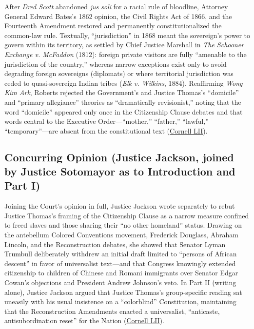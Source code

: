 \documentclass[12pt]{article}
\begin{document}
After \textit{Dred Scott} abandoned \textit{jus soli} for a racial rule of bloodline, Attorney General Edward Bates's 1862 opinion, the Civil Rights Act of 1866, and the Fourteenth Amendment restored and permanently constitutionalized the common-law rule. Textually, ``jurisdiction'' in 1868 meant the sovereign's power to govern within its territory, as settled by Chief Justice Marshall in \textit{The Schooner Exchange v. McFaddon} (1812): foreign private visitors are fully ``amenable to the jurisdiction of the country,'' whereas narrow exceptions exist only to avoid degrading foreign sovereigns (diplomats) or where territorial jurisdiction was ceded to quasi-sovereign Indian tribes (\textit{Elk v. Wilkins}, 1884). Reaffirming \textit{Wong Kim Ark}, Roberts rejected the Government's and Justice Thomas's ``domicile'' and ``primary allegiance'' theories as ``dramatically revisionist,'' noting that the word ``domicile'' appeared only once in the Citizenship Clause debates and that words central to the Executive Order---``mother,'' ``father,'' ``lawful,'' ``temporary''---are absent from the constitutional text (\href{https://www.law.cornell.edu/supremecourt/text/25-365}{Cornell LII}).

\subsection{Concurring Opinion (Justice Jackson, joined by Justice Sotomayor as to Introduction and Part I)}
Joining the Court's opinion in full, Justice Jackson wrote separately to rebut Justice Thomas's framing of the Citizenship Clause as a narrow measure confined to freed slaves and those sharing their ``no other homeland'' status. Drawing on the antebellum Colored Conventions movement, Frederick Douglass, Abraham Lincoln, and the Reconstruction debates, she showed that Senator Lyman Trumbull deliberately withdrew an initial draft limited to ``persons of African descent'' in favor of universalist text---and that Congress knowingly extended citizenship to children of Chinese and Romani immigrants over Senator Edgar Cowan's objections and President Andrew Johnson's veto. In Part II (writing alone), Justice Jackson argued that Justice Thomas's group-specific reading sat uneasily with his usual insistence on a ``colorblind'' Constitution, maintaining that the Reconstruction Amendments enacted a universalist, ``anticaste, antisubordination reset'' for the Nation (\href{https://www.law.cornell.edu/supremecourt/text/25-365}{Cornell LII}).
\end{document}
